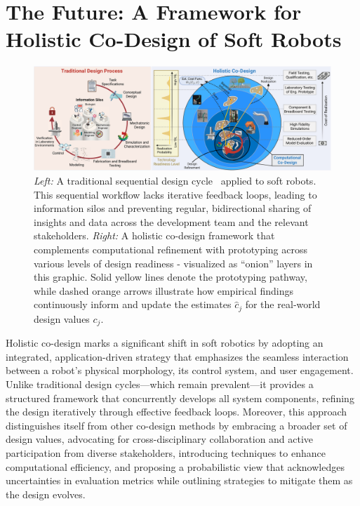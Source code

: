 \section{The Future: A Framework for Holistic Co-Design of Soft Robots}\label{sec:apx:holisticcodesign:holistic_co_design_framework}
\begin{figure}[h!]
    \centering
    \includegraphics[width=1\linewidth]{appendix-holistic-codesign/figures/holistic_codesign_vs_traditional_design_process_optimized.pdf}
    \caption{
        \textit{Left:} A traditional sequential design cycle~\citep{van2020delft} applied to soft robots. This sequential workflow lacks iterative feedback loops, leading to information silos and preventing regular, bidirectional sharing of insights and data across the development team and the relevant stakeholders.
        \textit{Right:} A holistic co-design framework that complements computational refinement with prototyping across various levels of design readiness - visualized as ``onion'' layers in this graphic. Solid yellow lines denote the prototyping pathway, while dashed orange arrows illustrate how empirical findings continuously inform and update the estimates $\hat{c}_j$ for the real‑world design values $c_j$.
    }
    \label{fig:apx:holisticcodesign:current_design_vs_holistic_codesign}
\end{figure}

Holistic co-design marks a significant shift in soft robotics by adopting an integrated, application-driven strategy that emphasizes the seamless interaction between a robot’s physical morphology, its control system, and user engagement. Unlike traditional design cycles—which remain prevalent—it provides a structured framework that concurrently develops all system components, refining the design iteratively through effective feedback loops. Moreover, this approach distinguishes itself from other co-design methods by embracing a broader set of design values, advocating for cross-disciplinary collaboration and active participation from diverse stakeholders, introducing techniques to enhance computational efficiency, and proposing a probabilistic view that acknowledges uncertainties in evaluation metrics while outlining strategies to mitigate them as the design evolves.

